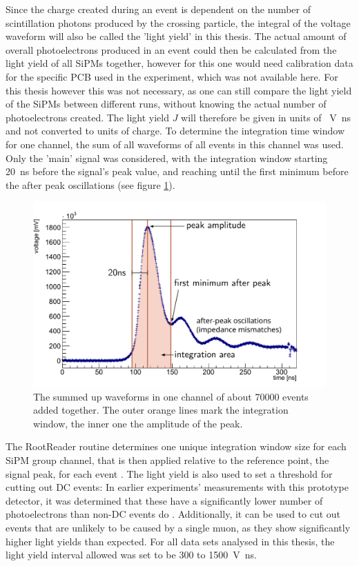 	
	Since the charge created during an event is dependent on the number of scintillation photons produced by the crossing particle, the integral of the voltage waveform will also be called the 'light yield' in this thesis. The actual amount of overall photoelectrons produced in an event could then be calculated from the light yield of all \acsp{SiPM} together, however for this one would need calibration data for the specific \ac{PCB} used in the experiment, which was not available here. 
	For this thesis however this was not necessary, as one can still compare the light yield of the \acsp{SiPM} between different runs, without knowing the actual number of photoelectrons created. The light yield $J$ will therefore be given in units of \SI{}{\volt\nano\second} and not converted to units of charge.
	To determine the integration time window for one channel, the sum of all waveforms of all events in this channel was used.  Only the 'main' signal was considered, with the integration window starting \SI{20}{\nano\second} before the signal's peak value, and reaching until the first minimum before the after peak oscillations (see figure \ref{fig:integration-window}).
	
	\begin{figure}[h]
		\centering
		\includegraphics[width=.8\textwidth]{pictures/integration-window.pdf}
		\caption{The summed up waveforms in one channel of about \num{70000} events added together. The outer orange lines mark the integration window, the inner one the amplitude of the peak.}
		\label{fig:integration-window}
	\end{figure}
	
	The RootReader routine determines one unique integration window size for each \ac{SiPM} group channel, that is then applied relative to the reference point, the signal peak, for each event \cite{ZIMMERMANN}.
	The light yield is also used to set a threshold for cutting out \ac{DC} events: In earlier experiments' measurements with this prototype detector, it was determined that these have a significantly lower number of photoelectrons than non-\ac{DC} events do \cite{HANEL,ZACHARIAS}. Additionally, it can be used to cut out events that are unlikely to be caused by a single muon, as they show significantly higher light yields than expected. For all data sets analysed in this thesis, the light yield interval allowed was set to be 300 to \SI{1500}{\volt\nano\second}. 
	
